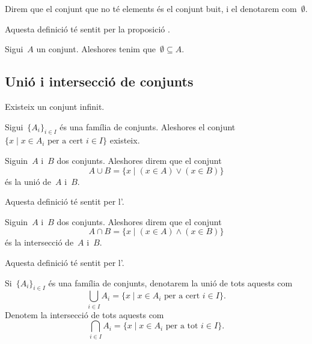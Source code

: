 \documentclass[../fonaments-de-les-matematiques.tex]{subfiles}
\begin{document}
    \begin{definition}
        Direm que el conjunt que no té elements és el conjunt buit, i el denotarem com~\(\emptyset\).

        Aquesta definició té sentit per la proposició .
    \end{definition}
    \begin{axiom}
        \label{axiom:axioma-de-regularitat}
        Sigui~\(A\) un conjunt.
        Aleshores tenim que~\(\emptyset\subseteq A\).
    \end{axiom}
    \subsection{Unió i intersecció de conjunts}
    \begin{axiom}
        Existeix un conjunt infinit.
    \end{axiom}
    \begin{axiom}
        \label{axiom:axioma-de-la-unio}
        Sigui~\(\{A_{i}\}_{i\in I}\) és una família de conjunts.
        Aleshores el conjunt~\(\{x\mid x\in A_{i}\text{ per a cert }i\in I\}\) existeix.
    \end{axiom}
    \begin{definition}
        \label{def:unio-de-conjunts}
        Siguin~\(A\) i~\(B\) dos conjunts.
        Aleshores direm que el conjunt
        \[
            A\cup B=\{x\mid(x\in A)\lor(x\in B)\}
        \]
        és la unió de~\(A\) i~\(B\).

        Aquesta definició té sentit per l'.
    \end{definition}
    \begin{definition}
        \label{def:interseccio-de-conjunts}
        Siguin~\(A\) i~\(B\) dos conjunts.
        Aleshores direm que el conjunt
        \[
            A\cap B=\{x\mid(x\in A)\land(x\in B)\}
        \]
        és la intersecció de~\(A\) i~\(B\).

        Aquesta definició té sentit per l'.
    \end{definition}
    \begin{notation}
        Si~\(\{A_{i}\}_{i\in I}\) és una família de conjunts, denotarem la unió de tots aquests com
        \[
            \bigcup_{i\in I}A_{i}=\{x\mid x\in A_{i}\text{ per a cert }i\in I\}.
        \]
        Denotem la intersecció de tots aquests com
        \[
            \bigcap_{i\in I}A_{i}=\{x\mid x\in A_{i}\text{ per a tot }i\in I\}.
        \]
    \end{notation}
\end{document}
